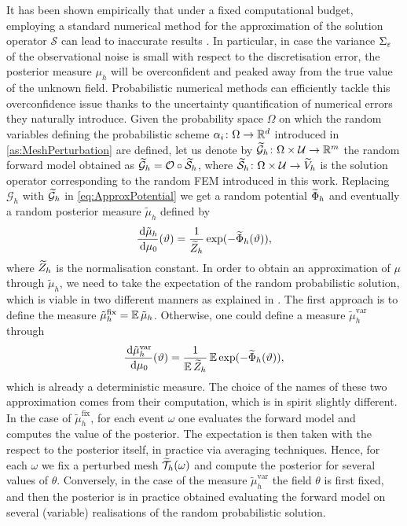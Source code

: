 \documentclass[10pt]{article}
\begin{document}
It has been shown empirically that under a fixed computational budget, employing a standard numerical method for the approximation of the solution operator $\mathcal S$ can lead to inaccurate results \cite{AbG20, CGS17, COS17}. In particular, in case the variance $\Sigma_\varepsilon$ of the observational noise is small with respect to the discretisation error, the posterior measure $\mu_h$ will be overconfident and peaked away from the true value of the unknown field. Probabilistic numerical methods can efficiently tackle this overconfidence issue thanks to the uncertainty quantification of numerical errors they naturally introduce. Given the probability space $\Omega$ on which the random variables defining the probabilistic scheme $\alpha_i \colon \Omega \to \mathbb{R}^d$ introduced in \cref{as:MeshPerturbation} are defined, let us denote by $\widetilde{\mathcal G}_h \colon \Omega \times \mathcal U \to \mathbb{R}^m$ the random forward model obtained as $\widetilde{\mathcal G}_h = \mathcal O \circ \widetilde{\mathcal S}_h$, where $\widetilde{\mathcal S}_h \colon \Omega \times \mathcal U \to \widetilde V_h$ is the solution operator corresponding to the random FEM introduced in this work. Replacing $\mathcal G_h$ with $\widetilde{\mathcal G}_h$ in \eqref{eq:ApproxPotential} we get a random potential $\widetilde \Phi_h$ and eventually a random posterior measure $\tilde \mu_h$ defined by
\begin{equation}
	\frac{\, \mathrm{d} \tilde \mu_h}{\, \mathrm{d} \mu_0}(\vartheta) = \frac{1}{\widetilde Z_h}\exp(-\widetilde \Phi_h(\vartheta)),
\end{equation}
where $\widetilde Z_h$ is the normalisation constant. In order to obtain an approximation of $\mu$ through $\tilde \mu_h$, we need to take the expectation of the random probabilistic solution, which is viable in two different manners as explained in \cite{LST18}. The first approach is to define the measure $\tilde \mu_h^{\mathrm{fix}} = \operatorname{\mathbb{E}} \tilde \mu_h$. Otherwise, one could define a measure $\tilde \mu_h^{\mathrm{var}}$ through
\begin{equation}
	\frac{\, \mathrm{d} \tilde \mu_h^{\mathrm{var}}}{\, \mathrm{d} \mu_0}(\vartheta) = \frac{1}{\operatorname{\mathbb{E}} \widetilde Z_h} \operatorname{\mathbb{E}} \exp(-\widetilde \Phi_h(\vartheta)),
\end{equation}
which is already a deterministic measure. The choice of the names of these two approximation comes from their computation, which is in spirit slightly different. In the case of $\tilde \mu_h^{\mathrm{fix}}$, for each event $\omega$ one evaluates the forward model and computes the value of the posterior. The expectation is then taken with the respect to the posterior itself, in practice via averaging techniques. Hence, for each $\omega$ we fix a perturbed mesh $\widetilde {\mathcal T}_h(\omega)$ and compute the posterior for several values of $\theta$. Conversely, in the case of the measure $\tilde \mu_h^{\mathrm{var}}$ the field $\theta$ is first fixed, and then the posterior is in practice obtained evaluating the forward model on several (variable) realisations of the random probabilistic solution.
\end{document}
